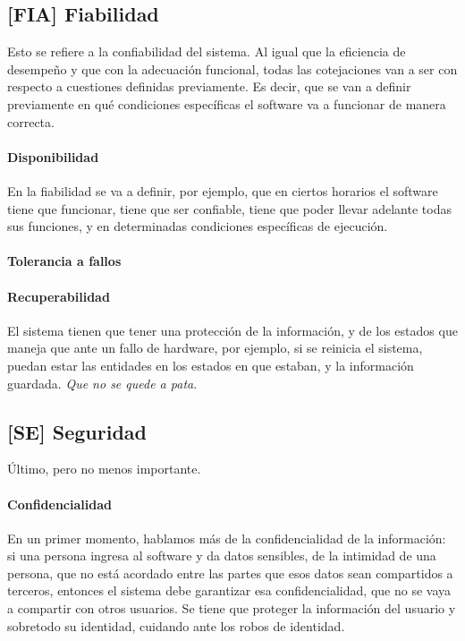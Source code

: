 \hypertarget{fiabilidad-fia}{%
\subsection{%
{[}FIA{]}
Fiabilidad
}\label{fiabilidad-fia}}

Esto se refiere a la confiabilidad del sistema. Al igual que la
eficiencia de desempeño y que con la adecuación funcional, todas las
cotejaciones van a ser con respecto a cuestiones definidas previamente.
Es decir, que se van a definir previamente en qué condiciones
específicas el software va a funcionar de manera correcta.

\paragraph{Disponibilidad}
En la fiabilidad se va a definir, por ejemplo, que en ciertos horarios
el software tiene que funcionar, tiene que ser confiable, tiene que
poder llevar adelante todas sus funciones, y en determinadas condiciones
específicas de ejecución.


\paragraph{Tolerancia a fallos}

\paragraph{Recuperabilidad}
El sistema tienen que tener una protección de la información, y
de los estados que maneja que ante un fallo de hardware, por ejemplo, si
se reinicia el sistema, puedan estar las entidades en los estados en que
estaban, y la información guardada. \textit{Que no se quede a pata}.

\hypertarget{seguridad-se}{%
\subsection{%
{[}SE{]}
Seguridad
}\label{seguridad-se}}

Último, pero no menos importante.


\hypertarget{confidencialidad}{%
\paragraph{Confidencialidad}\label{confidencialidad}}
En un primer momento, hablamos más de la
  confidencialidad de la información: si una persona ingresa al software
  y da datos sensibles, de la intimidad de una persona, que no está
  acordado entre las partes que esos datos sean compartidos a terceros,
  entonces el sistema debe garantizar esa confidencialidad, que no se
  vaya a compartir con otros usuarios. Se tiene que proteger la
  información del usuario y sobretodo su identidad, cuidando ante los
  robos de identidad.

